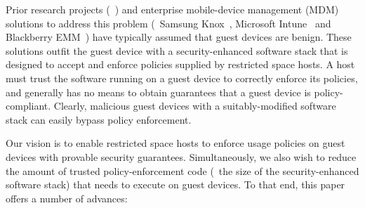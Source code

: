 Prior research projects
(\eg~\cite{asm:sec14,flaskdroid:sec13,conxsense:asiaccs14,worlddriven:ccs14,blindspot:2009,markit:upside14})
and enterprise mobile-device management (MDM) solutions to address this problem
(\eg\ Samsung Knox~\cite{knox:mdm}, Microsoft Intune~\cite{ms:intune} and
Blackberry EMM~\cite{blackberry:emm}) have typically assumed that guest devices
are benign. These solutions outfit the guest device with a security-enhanced
software stack that is designed to accept and enforce policies supplied by
restricted space hosts. A host must trust the software running on a guest
device to correctly enforce its policies, and generally has no means to obtain
guarantees that a guest device is policy-compliant.  Clearly, malicious guest
devices with a suitably-modified software stack can easily bypass policy
enforcement.

Our vision is to enable restricted space hosts to enforce usage policies on
guest devices with provable security guarantees. Simultaneously, we also wish
to reduce the amount of trusted policy-enforcement code (\ie~the size of the
security-enhanced software stack) that needs to execute on guest devices. To
that end, this paper offers a number of advances:

